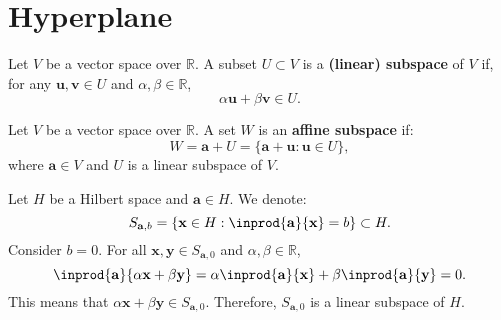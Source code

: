 \documentclass{huhtakm-template-book-v2}
\begin{document}
\section{Hyperplane}
    \begin{defn}
        Let $V$ be a vector space over $\mathbb{R}$. A subset $U \subset V$ is a \textbf{(linear) subspace} of $V$ if, for any $\mathbf{u},\mathbf{v}\in U$ and $\alpha, \beta \in \mathbb{R}$,
        \begin{equation*}
            \alpha\mathbf{u} + \beta\mathbf{v} \in U.
        \end{equation*}
    \end{defn}
    \begin{defn}
        Let $V$ be a vector space over $\mathbb{R}$. A set $W$ is an \textbf{affine subspace} if:
        \begin{equation*}
            W = \mathbf{a}+U = \{\mathbf{a}+\mathbf{u}:\mathbf{u}\in U\},
        \end{equation*}
        where $\mathbf{a} \in V$ and $U$ is a linear subspace of $V$.
    \end{defn}
    Let $H$ be a Hilbert space and $\mathbf{a}\in H$. We denote:
    \begin{equation*}
        S_{\mathbf{a},b} = \{\mathbf{x} \in H:\inprod{\mathbf{a}}{\mathbf{x}}=b\} \subset H.
    \end{equation*}
    Consider $b = 0$. For all $\mathbf{x}, \mathbf{y} \in S_{\mathbf{a},0}$ and $\alpha, \beta \in \mathbb{R}$,
    \begin{equation*}
        \inprod{\mathbf{a}}{\alpha\mathbf{x} + \beta\mathbf{y}} = \alpha\inprod{\mathbf{a}}{\mathbf{x}} + \beta\inprod{\mathbf{a}}{\mathbf{y}} = 0.
    \end{equation*}
    This means that $\alpha\mathbf{x} + \beta\mathbf{y} \in S_{\mathbf{a},0}$. Therefore, $S_{\mathbf{a},0}$ is a linear subspace of $H$.
\end{document}
